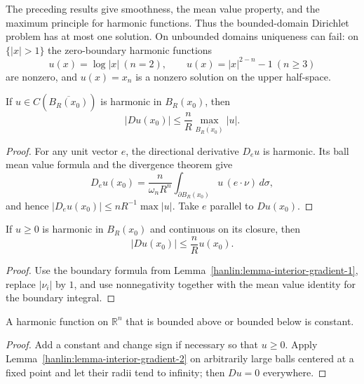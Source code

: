 \begin{remark}\label{hanlin:remark-mvp-harmonic-smooth}
The preceding results give smoothness, the mean value property, and the maximum
principle for harmonic functions. Thus the bounded-domain Dirichlet problem
has at most one solution. On unbounded domains uniqueness can fail: on
$\{|x|>1\}$ the zero-boundary harmonic functions
\[
u(x)=\log|x|\ (n=2),\qquad u(x)=|x|^{2-n}-1\ (n\ge3)
\]
are nonzero, and $u(x)=x_n$ is a nonzero solution on the upper half-space.
\end{remark}

\begin{lemma}\label{hanlin:lemma-interior-gradient-1}
If $u\in C(\overline{B_R(x_0)})$ is harmonic in $B_R(x_0)$, then
\[
|Du(x_0)|\le\frac nR\max_{\overline{B_R(x_0)}}|u|.
\]
\end{lemma}
\begin{proof}
\sketch For any unit vector $e$, the directional derivative $D_eu$ is harmonic.
Its ball mean value formula and the divergence theorem give
\[
D_eu(x_0)=\frac n{\omega_nR^n}\int_{\partial B_R(x_0)}u\,(e\cdot\nu)\,d\sigma,
\]
and hence $|D_eu(x_0)|\le nR^{-1}\max|u|$. Take $e$ parallel to $Du(x_0)$.
\end{proof}

\begin{lemma}\label{hanlin:lemma-interior-gradient-2}
If $u\ge0$ is harmonic in $B_R(x_0)$ and continuous on its closure, then
\[
|Du(x_0)|\le\frac nR u(x_0).
\]
\end{lemma}
\begin{proof}
\sketch Use the boundary formula from Lemma~\ref{hanlin:lemma-interior-gradient-1},
replace $|\nu_i|$ by $1$, and use nonnegativity together with the mean value
identity for the boundary integral.
\end{proof}

\begin{corollary}\label{hanlin:corollary-liouville}
A harmonic function on $\mathbb R^n$ that is bounded above or bounded below is
constant.
\end{corollary}
\begin{proof}
\sketch Add a constant and change sign if necessary so that $u\ge0$. Apply
Lemma~\ref{hanlin:lemma-interior-gradient-2} on arbitrarily large balls centered
at a fixed point and let their radii tend to infinity; then $Du=0$ everywhere.
\end{proof}

